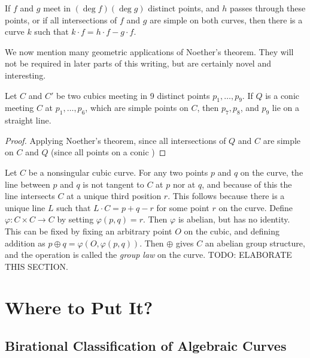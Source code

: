 \begin{corollary}
    If $f$ and $g$ meet in $(\deg f)(\deg g)$ distinct points, and $h$ passes through these points, or if all intersections of $f$ and $g$ are simple on both curves, then there is a curve $k$ such that $k \cdot f = h \cdot f - g \cdot f$.
\end{corollary}

We now mention many geometric applications of Noether's theorem. They will not be required in later parts of this writing, but are certainly novel and interesting.

\begin{theorem}
    Let $C$ and $C'$ be two cubics meeting in 9 distinct points $p_1, \dots, p_9$. If $Q$ is a conic meeting $C$ at $p_1, \dots, p_6$, which are simple points on $C$, then $p_7, p_8$, and $p_9$ lie on a straight line.
\end{theorem}
\begin{proof}
    Applying Noether's theorem, since all intersections of $Q$ and $C$ are simple on $C$ and $Q$ (since all points on a conic )
\end{proof}

Let $C$ be a nonsingular cubic curve. For any two points $p$ and $q$ on the curve, the line between $p$ and $q$ is not tangent to $C$ at $p$ nor at $q$, and because of this the line intersects $C$ at a unique third position $r$. This follows because there is a unique line $L$ such that $L \cdot C = p + q - r$ for some point $r$ on the curve. Define $\varphi: C \times C \to C$ by setting $\varphi(p,q) = r$. Then $\varphi$ is abelian, but has no identity. This can be fixed by fixing an arbitrary point $O$ on the cubic, and defining addition as $p \oplus q = \varphi(O, \varphi(p,q))$. Then $\oplus$ gives $C$ an abelian group structure, and the operation is called the \emph{group law} on the curve. TODO: ELABORATE THIS SECTION.


\chapter{Where to Put It?}

\section{Birational Classification of Algebraic Curves}

